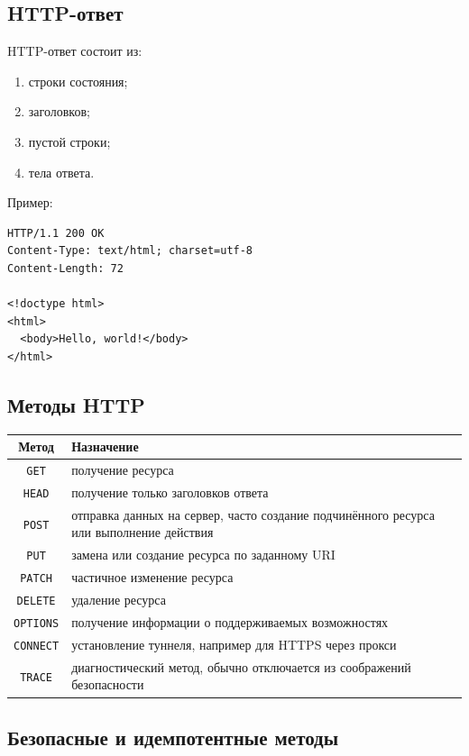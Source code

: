 \documentclass[12pt,a4paper]{article}
\begin{document}
\subsection{HTTP-ответ}

HTTP-ответ состоит из:
\begin{enumerate}
    \item строки состояния;
    \item заголовков;
    \item пустой строки;
    \item тела ответа.
\end{enumerate}

Пример:
\begin{lstlisting}
HTTP/1.1 200 OK
Content-Type: text/html; charset=utf-8
Content-Length: 72

<!doctype html>
<html>
  <body>Hello, world!</body>
</html>
\end{lstlisting}

\subsection{Методы HTTP}

\begin{center}
\begin{tabular}{|c|p{9cm}|}
\hline
Метод & Назначение \\
\hline
\texttt{GET} & получение ресурса \\
\hline
\texttt{HEAD} & получение только заголовков ответа \\
\hline
\texttt{POST} & отправка данных на сервер, часто создание подчинённого ресурса или выполнение действия \\
\hline
\texttt{PUT} & замена или создание ресурса по заданному URI \\
\hline
\texttt{PATCH} & частичное изменение ресурса \\
\hline
\texttt{DELETE} & удаление ресурса \\
\hline
\texttt{OPTIONS} & получение информации о поддерживаемых возможностях \\
\hline
\texttt{CONNECT} & установление туннеля, например для HTTPS через прокси \\
\hline
\texttt{TRACE} & диагностический метод, обычно отключается из соображений безопасности \\
\hline
\end{tabular}
\end{center}

\subsection{Безопасные и идемпотентные методы}
\end{document}
